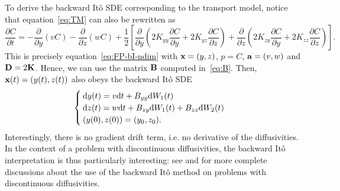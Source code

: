 To derive the backward Itô SDE corresponding to the transport model, notice that equation~\eqref{eq:TM} can also be rewritten as
\begin{equation}\label{eq:TM-bito}
	\frac{\partial C}{\partial t} = -\frac{\partial}{\partial y}(vC) -\frac{\partial}{\partial z}(wC) + \frac{1}{2}\left[\frac{\partial}{\partial y} \left(2K_{yy}\frac{\partial C}{\partial y} + 2K_{yz}\frac{\partial C}{\partial z} \right) + \frac{\partial}{\partial z} \left(2K_{zy}\frac{\partial C}{\partial y} + 2K_{zz}\frac{\partial C}{\partial z}\right)\right].
\end{equation}
This is precisely equation~\eqref{eq:FP-bI-ndim} with $\b x = (y,z)$, $p=C$, $\b a = (v,w)$ and $\b D = 2\b K$. Hence, we can use the matrix $\b B$ computed in~\eqref{eq:B}. Then, $\b x(t) = (y(t),z(t))$ also obeys the backward Itô SDE
\begin{equation} \label{eq:bi-TM}
	\begin{cases}
		\rm dy(t) = v \rm dt + B_{yy}\rm dW_1(t)\\
		\rm dz(t) = w \rm dt + B_{zy}\rm dW_1(t) + B_{zz}\rm dW_2(t)\\
		(y(0),z(0)) = (y_0,z_0).
	\end{cases}
\end{equation}
Interestingly, there is no gradient drift term, i.e. no derivative of the diffusivities. In the context of a problem with discontinuous diffusivities, the backward Itô interpretation is thus particularly interesting: see \cite{labolle2000diffusion} and \cite{spivakovskaya2007backward} for more complete discussions about the use of the backward Itô method on problems with discontinuous diffusivities.